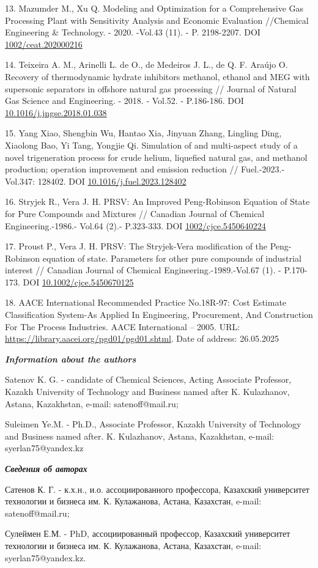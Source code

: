 13. Mazumder M., Xu Q. Modeling and Optimization for a Comprehensive Gas
Processing Plant with Sensitivity Analysis and Economic Evaluation
//Chemical Engineering \& Technology. - 2020. -Vol.43 (11). - P.
2198-2207. DOI
\href{https://doi.org/1002/ceat.202000216}{1002/ceat.202000216}

14. Teixeira A. M., Arinelli L. de O., de Medeiros J. L., de Q. F.
Araújo O. Recovery of thermodynamic hydrate inhibitors methanol, ethanol
and MEG with supersonic separators in offshore natural gas processing //
Journal of Natural Gas Science and Engineering. - 2018. - Vol.52. -
P.186-186. DOI
\href{https://doi:10.1016/j.jngse.2018.01.038}{10.1016/j.jngse.2018.01.038}

15. Yang Xiao, Shengbin Wu, Hantao Xia, Jinyuan Zhang, Lingling Ding,
Xiaolong Bao, Yi Tang, Yongjie Qi. Simulation of and multi-aspect study
of a novel trigeneration process for crude helium, liquefied natural
gas, and methanol production; operation improvement and emission
reduction // Fuel.-2023.-Vol.347: 128402. DOI
\href{https://doi.org/10.1016/j.fuel.2023.128402}{10.1016/j.fuel.2023.128402}

16. Stryjek R., Vera J. H. PRSV: An Improved Peng-Robinson Equation of
State for Pure Compounds and Mixtures // Canadian Journal of Chemical
Engineering.-1986.- Vol.64 (2).- P.323-333. DOI
\href{https://doi:1002/cjce.5450640224}{1002/cjce.5450640224}

17. Proust P., Vera J. H. PRSV: The Stryjek-Vera modification of the
Peng-Robinson equation of state. Parameters for other pure compounds of
industrial interest // Canadian Journal of Chemical
Engineering.-1989.-Vol.67 (1). - P.170-173. DOI
\href{https://doi.org/10.1002/cjce.5450670125}{10.1002/cjce.5450670125}

18. AACE International Recommended Practice No.18R-97: Cost Estimate
Classification System-As Applied In Engineering, Procurement, And
Construction For The Process Industries. AACE International -- 2005.
URL: \url{https://library.aacei.org/pgd01/pgd01.shtml}. Date of address:
26.05.2025

\emph{{\bfseries Information about the authors}}

Satenov K. G. - candidate of Chemical Sciences, Acting Associate
Professor, Kazakh University of Technology and Business named after K.
Kulazhanov, Astana, Kazakhstan, e-mail:
satenoff@mail.ru;

Suleimen Ye.M. - Ph.D., Associate Professor, Kazakh University of
Technology and Business named after. K. Kulazhanov, Astana, Kazakhstan,
e-mail:
syerlan75@yandex.kz

\emph{{\bfseries Сведения об авторах}}

Сатенов К. Г. - к.х.н., и.о. ассоциированного профессора, Казахский
университет технологии и бизнеса им. К. Кулажанова, Астана, Казахстан,
e-mail: satenoff@mail.ru;

Сулеймен Е.М. - PhD, ассоциированный профессор, Казахский университет
технологии и бизнеса им. К. Кулажанова, Астана, Казахстан, e-mail:
syerlan75@yandex.kz.\

